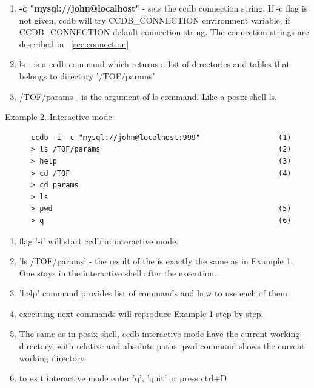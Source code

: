 \documentclass{article}
\begin{document}
\begin{enumerate}
\item \textbf{-c "mysql://john@localhost"} - sets the ccdb connection string.
      If -c flag is not given, ccdb will try CCDB\_CONNECTION environment
      variable, if CCDB\_CONNECTION  default connection string. The connection
      strings are described in ~\ref{sec:connection}

\item ls - is a ccdb command which returns a list of directories and tables
      that belongs to directory '/TOF/params'

\item /TOF/params - is the argument of ls command. Like a posix shell ls.
\end{enumerate}
\vspace{1 em}


Example 2. Interactive mode:
\begin{verbatim}
      ccdb -i -c "mysql://john@localhost:999"                  (1)
      > ls /TOF/params                                         (2)
      > help                                                   (3)
      > cd /TOF                                                (4)
      > cd params
      > ls
      > pwd                                                    (5)
      > q                                                      (6)
\end{verbatim}


\begin{enumerate}
  \item flag '-i'  will start ccdb in interactive mode.

  \item 'ls /TOF/params' - the result of the is exactly the same as in Example 1.
         One stays in the interactive shell after the execution.

  \item 'help' command provides list of commands and how to use each of them

  \item executing next commands will reproduce Example 1 step by step.

  \item  The same as in posix shell, ccdb interactive mode have the current
         working directory, with relative and absolute paths.
         pwd command shows the current working directory.

  \item to exit interactive mode enter 'q', 'quit' or press ctrl+D
\end{enumerate}
\end{document}
